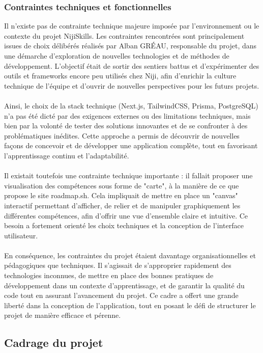 \documentclass[12pt]{article}
\begin{document}
\subsubsection{Contraintes techniques et fonctionnelles}
Il n’existe pas de contrainte technique majeure imposée par l’environnement ou le contexte du projet NijiSkills. Les contraintes rencontrées sont principalement issues de choix délibérés réalisés par Alban GRÉAU, responsable du projet, dans une démarche d’exploration de nouvelles technologies et de méthodes de développement. L’objectif était de sortir des sentiers battus et d’expérimenter des outils et frameworks encore peu utilisés chez Niji, afin d’enrichir la culture technique de l’équipe et d’ouvrir de nouvelles perspectives pour les futurs projets.
\\\\
Ainsi, le choix de la stack technique (Next.js, TailwindCSS, Prisma, PostgreSQL) n’a pas été dicté par des exigences externes ou des limitations techniques, mais bien par la volonté de tester des solutions innovantes et de se confronter à des problématiques inédites. Cette approche a permis de découvrir de nouvelles façons de concevoir et de développer une application complète, tout en favorisant l’apprentissage continu et l’adaptabilité.
\\\\
Il existait toutefois une contrainte technique importante : il fallait proposer une visualisation des compétences sous forme de "carte", à la manière de ce que propose le site roadmap.sh. Cela impliquait de mettre en place un "canvas" interactif permettant d’afficher, de relier et de manipuler graphiquement les différentes compétences, afin d’offrir une vue d’ensemble claire et intuitive. Ce besoin a fortement orienté les choix techniques et la conception de l’interface utilisateur.
\\\\
En conséquence, les contraintes du projet étaient davantage organisationnelles et pédagogiques que techniques. Il s’agissait de s’approprier rapidement des technologies inconnues, de mettre en place des bonnes pratiques de développement dans un contexte d’apprentissage, et de garantir la qualité du code tout en assurant l’avancement du projet. Ce cadre a offert une grande liberté dans la conception de l’application, tout en posant le défi de structurer le projet de manière efficace et pérenne.
\subsection{Cadrage du projet}
\end{document}
